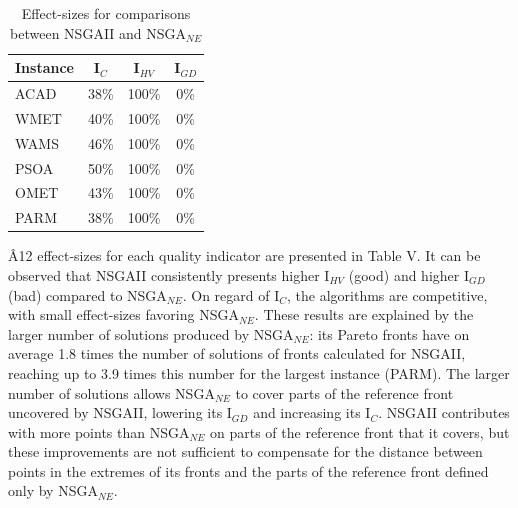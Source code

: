 \documentclass[conference]{IEEEtran}
\begin{document}
\begin{table}[htbp]
  \scriptsize
	\centering
  \caption{Effect-sizes for comparisons between NSGAII and NSGA$_{NE}$}
    \begin{tabular}{lccc}
    \toprule
    \textbf{Instance} & \textbf{I$_{C}$} & \textbf{I$_{HV}$} & \textbf{I$_{GD}$} \\
    \midrule
    ACAD  & 38\%  & 100\% & 0\% \\
    WMET  & 40\%  & 100\% & 0\% \\
    WAMS  & 46\%  & 100\% & 0\% \\
    PSOA  & 50\%  & 100\% & 0\% \\
    OMET  & 43\%  & 100\% & 0\% \\
    PARM  & 38\%  & 100\% & 0\% \\
    \bottomrule
    \end{tabular}%
\end{table}%

{\^A12} effect-sizes for each quality indicator are presented in Table V. It can be observed that NSGAII consistently presents higher I$_{HV}$ (good) and higher I$_{GD}$ (bad) compared to NSGA$_{NE}$. On regard of I$_{C}$, the algorithms are competitive, with small effect-sizes favoring NSGA$_{NE}$. These results are explained by the larger number of solutions produced by NSGA$_{NE}$: its Pareto fronts have on average 1.8 times the number of solutions of fronts calculated for NSGAII, reaching up to 3.9 times this number for the largest instance (PARM). The larger number of solutions allows NSGA$_{NE}$ to cover parts of the reference front uncovered by NSGAII, lowering its I$_{GD}$ and increasing its I$_{C}$. NSGAII contributes with more points than NSGA$_{NE}$ on parts of the reference front that it covers, but these improvements are not sufficient to compensate for the distance between points in the extremes of its fronts and the parts of the reference front defined only by NSGA$_{NE}$.
\end{document}
